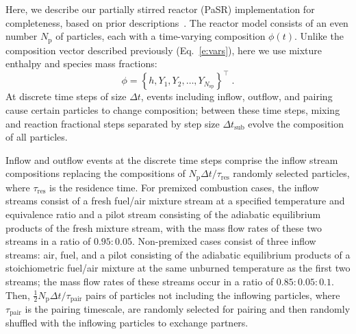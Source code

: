 \documentclass[preprint,12pt]{elsarticle}
\newcommand{ \numsp }{N_{\text{sp}}}
\begin{document}
{Here, we describe our partially stirred reactor (PaSR) implementation for completeness, based on prior descriptions~\cite{Correa:1993ud,Chen:1997ta,Pope:1997wu,Bhave:2004hc,Ren:2004fz,Ren:2014cd}.
The reactor model consists of an even number $N_{\text{p}}$ of particles, each with a time-varying composition $\phi (t)$.
Unlike the composition vector described previously (Eq.~\eqref{e:vars}), here we use mixture enthalpy and species mass fractions:
\begin{equation}
\phi = \left \lbrace h, Y_1, Y_2, \dotsc, Y_{\numsp} \right \rbrace^{\intercal} \;.
\end{equation}
At discrete time steps of size $\Delta t$, events including inflow, outflow, and pairing cause certain particles to change composition; between these time steps, mixing and reaction fractional steps separated by step size $\Delta t_{\text{sub}}$ evolve the composition of all particles.

Inflow and outflow events at the discrete time steps comprise the inflow stream compositions replacing the compositions of $N_{\text{p}} \Delta t / \tau_{\text{res}}$ randomly selected particles, where $\tau_{\text{res}}$ is the residence time.
For premixed combustion cases, the inflow streams consist of a fresh fuel\slash air mixture stream at a specified temperature and equivalence ratio and a pilot stream consisting of the adiabatic equilibrium products of the fresh mixture stream, with the mass flow rates of these two streams in a ratio of $0.95 \mathbin{:} 0.05$.
Non-premixed cases consist of three inflow streams: air, fuel, and a pilot consisting of the adiabatic equilibrium products of a stoichiometric fuel\slash air mixture at the same unburned temperature as the first two streams; the mass flow rates of these streams occur in a ratio of $0.85 \mathbin{:} 0.05 \mathbin{:} 0.1$.
Then, $\frac{1}{2} N_{\text{p}} \Delta t / \tau_{\text{pair}}$ pairs of particles not including the inflowing particles, where $\tau_{\text{pair}}$ is the pairing timescale, are randomly selected for pairing and then randomly shuffled with the inflowing particles to exchange partners.

}
\end{document}
